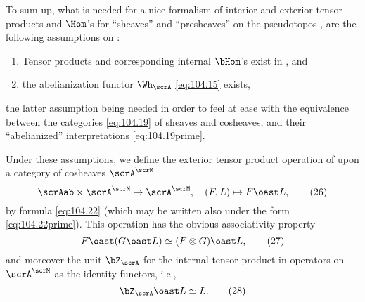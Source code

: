To sum up, what is needed for a nice formalism of interior and
exterior tensor products and $\Hom$'s for ``sheaves'' and
``presheaves'' on the pseudotopos \scrA, are the following assumptions
on \scrA:
\begin{enumerate}[label=\arabic*)]
\item\label{it:104.C.1}
  Tensor products and corresponding internal $\bHom$'s exist in
  \scrAab, and
\item\label{it:104.C.2}
  the abelianization functor $\Wh_\scrA$ \eqref{eq:104.15} exists,
\end{enumerate}
the latter assumption being needed in order to feel at ease with the
equivalence between the categories \eqref{eq:104.19} of sheaves and
cosheaves, and their ``abelianized'' interpretations
\eqref{eq:104.19prime}.

Under these assumptions, we define the exterior tensor product
operation of \scrAab{} upon a category of cosheaves $\scrA^\scrM$
\begin{equation}
  \label{eq:104.26}
  \scrAab\times\scrA^\scrM \to \scrA^\scrM, \quad
  (F,L)\mapsto F\oast L,\tag{26}
\end{equation}
by formula \eqref{eq:104.22} (which may be written also under the form
\eqref{eq:104.22prime}). This operation has the obvious associativity
property
\begin{equation}
  \label{eq:104.27}
  F\oast(G\oast L)\simeq (F\otimes G)\oast L,\tag{27}
\end{equation}
and moreover the unit $\bZ_\scrA$ for the internal tensor product in
\scrAab{} operators on $\scrA^\scrM$ as the identity functors,
i.e.,
\begin{equation}
  \label{eq:104.28}
  \bZ_\scrA\oast L\simeq L.\tag{28}
\end{equation}

